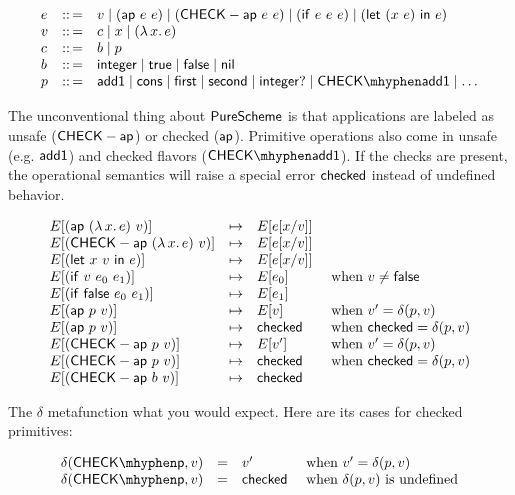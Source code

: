 \documentclass{article}
\begin{document}
\[\begin{array}{l c l}
   e & \coloneq & v \mid (\eap~e~e) \mid (\ecap~e~e) \mid (\eif~e~e~e) \mid (\elet{(x~e)}{e})
\\ v & \coloneq & c \mid x \mid (\elam{x}{e})
\\ c & \coloneq & b \mid p
\\ b & \coloneq & \mathsf{integer} \mid \etrue{} \mid \efalse{} \mid \enil{}
\\ p & \coloneq & \eadd \mid \econs \mid \efirst \mid \esecond \mid \eintp \mid \ecadd \mid \ldots
  \end{array}\]

The unconventional thing about $\mathsf{PureScheme}{}$ is that applications are labeled
 as unsafe ($\mathsf{CHECK-ap}$) or checked ($\mathsf{ap}$).
Primitive operations also come in unsafe (e.g. $\mathsf{add1}$) and checked flavors ($\ecadd$).
If the checks are present, the operational semantics will raise a special error
 $\mathsf{checked}$ instead of undefined behavior.

\[\begin{array}{l c l l}
   E[(\mathsf{ap}~(\lambda\,x.\,e)~v)] & \mapsto & E[e[x/v]] &
\\ E[(\mathsf{CHECK-ap}~(\lambda\,x.\,e)~v)] & \mapsto & E[e[x/v]] &
\\ E[(\mathsf{let}~x~v~\mathsf{in}~e)] & \mapsto & E[e[x/v]] &
\\ E[(\mathsf{if}~v~e_0~e_1)] & \mapsto & E[e_0] & \mbox{ when } v \neq \mathsf{false}
\\ E[(\mathsf{if}~\mathsf{false}~e_0~e_1)] & \mapsto & E[e_1] &
\\ E[(\mathsf{ap}~p~v)] & \mapsto & E[v]  & \mbox{ when } v' = \delta(p, v)
\\ E[(\mathsf{ap}~p~v)] & \mapsto & \mathsf{checked} & \mbox{ when } \mathsf{checked} = \delta(p, v)
\\ E[(\mathsf{CHECK-ap}~p~v)] & \mapsto & E[v'] & \mbox{ when } v' = \delta(p, v)
\\ E[(\mathsf{CHECK-ap}~p~v)] & \mapsto & \mathsf{checked} & \mbox{ when } \mathsf{checked} = \delta(p, v)
\\ E[(\mathsf{CHECK-ap}~b~v)] & \mapsto & \mathsf{checked} &
  \end{array}\]

The $\delta$ metafunction what you would expect.
Here are its cases for checked primitives:

\[\begin{array}{l c l l}
  \delta(\mathsf{CHECK{\mhyphen}p}, v) & = & v' & \mbox{ when } v' = \delta(p, v)
\\\delta(\mathsf{CHECK{\mhyphen}p}, v) & = & \echecked & \mbox{ when } \delta(p, v) \mbox{ is undefined}
  \end{array}\]
\end{document}
